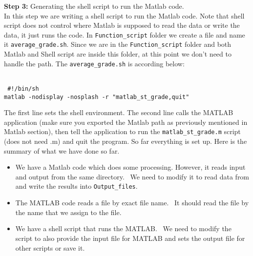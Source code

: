 
\textbf{Step 3:} Generating the shell script to run the Matlab code. \\

\noindent
In this step we are writing a shell script to run the Matlab code. Note that shell script does not control where Matlab is supposed to read the data or write the data, it just runs the code. In \texttt{Function\_script} folder we create a file and name it \texttt{average\_grade.sh}. Since we are in the \texttt{Function\_script} folder and both Matlab and Shell script are inside this folder, at this point we don't need to handle the path.  The  \texttt{average\_grade.sh} is according below:\\
 
 \begin{mdframed}[hidealllines=true,backgroundcolor=gray!20]
 \begin{singlespace}
 \fontsize{10pt}{1pt}
\texttt{
\\
\noindent
{ \color{matlab_green} \#!/bin/sh} \\
matlab -nodisplay -nosplash -r {\color{red}"matlab\_st\_grade,quit"}\\
 }
 \end{singlespace}
\end{mdframed}

\noindent
The first line sets the shell environment. The second line calls the MATLAB application (make sure you exported the Matlab path as previously mentioned in Matlab section), then tell the application to run  the \texttt{matlab\_st\_grade.m} script (does not need .m) and quit the program.  So far everything is set up. Here is the summary of what we have done so far. \\

\begin{itemize}

\item{We have a Matlab code which does some processing. However, it reads input and output from the same directory. \tab \ We need to modify it to read data from and write the results into \texttt{Output\_files}.}
\item{The MATLAB code reads a file by exact file name. \tab \ It should read the file by the name that we assign to the file.}
\item{We have a shell script that runs the MATLAB. \tab \ We need to modify the script to also provide the input file for MATLAB and sets the output file for other scripts or save it.}
\end{itemize}



